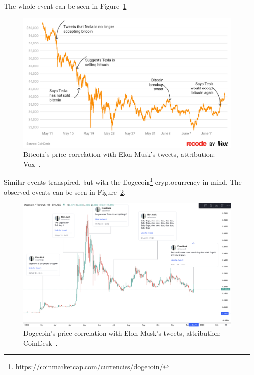 The whole event can be seen in Figure~\ref{figure-vox-elon}.

\begin{figure}[!t]
    \centering
    \includegraphics[width=\columnwidth]{figures/vox-elon.png}
    \caption{Bitcoin's price correlation with Elon Musk's tweets, attribution: Vox~\cite{vox:elon}.}
    \label{figure-vox-elon}
\end{figure}

Similar events transpired, but with the Dogecoin\footnote{\url{https://coinmarketcap.com/currencies/dogecoin/}} cryptocurrency in mind. The observed events can be seen in Figure~\ref{figure-coindesk-elon}.

\begin{figure}[!t]
    \centering
    \includegraphics[width=\columnwidth]{figures/coindesk-elon.png}
    \caption{Dogecoin's price correlation with Elon Musk's tweets, attribution: CoinDesk~\cite{coindesk:elon}.}
    \label{figure-coindesk-elon}
\end{figure}

